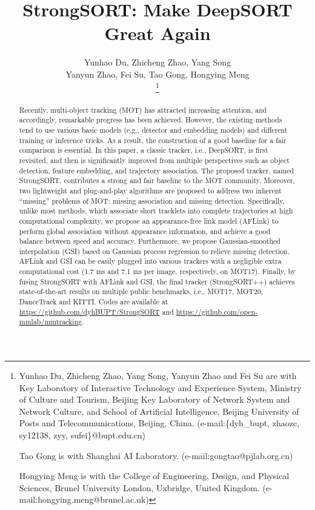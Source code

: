 \documentclass[lettersize,journal]{IEEEtran}
\begin{document}
\title{StrongSORT: Make DeepSORT Great Again}

\author{Yunhao Du, Zhicheng Zhao, Yang Song \\ Yanyun Zhao, Fei Su, Tao Gong, Hongying Meng \\
\thanks{
  Yunhao Du, Zhicheng Zhao, Yang Song, Yanyun Zhao and Fei Su 
  are with Key Laboratory of Interactive Technology and Experience System, Ministry of Culture and Tourism,
  Beijing Key Laboratory of Network System and Network Culture, 
  and School of Artificial Intelligence, Beijing University of Posts and Telecommunications, Beijing, China. 
  (e-mail:\{dyh\_bupt, zhaozc, sy12138, zyy, sufei\}@bupt.edu.cn)

  Tao Gong is with Shanghai AI Laboratory.
  (e-mail:gongtao@pjlab.org.cn)

  Hongying Meng is with the College of Engineering, Design, and Physical Sciences,
  Brunel University London, Uxbridge, United Kingdom.
  (e-mail:hongying.meng@brunel.ac.uk)
}
}






\maketitle

\begin{abstract}
  Recently, multi-object tracking (MOT) has attracted increasing attention, and accordingly, remarkable progress has been achieved.
  However, the existing methods tend to use various basic models (e.g., detector and embedding models) and different training or inference tricks.
  As a result, the construction of a good baseline for a fair comparison is essential.
  In this paper, a classic tracker, i.e., DeepSORT, is first revisited, 
  and then is significantly improved from multiple perspectives such as object detection, feature embedding, and trajectory association.
  The proposed tracker, named StrongSORT, contributes a strong and fair baseline to the MOT community.
  Moreover, two lightweight and plug-and-play algorithms are proposed to address two inherent ``missing'' problems of MOT: missing association and missing detection.
  Specifically, unlike most methods, which associate short tracklets into complete trajectories at high computational complexity, 
  we propose an appearance-free link model (AFLink) to perform global association without appearance information, and achieve a good balance between speed and accuracy.
  Furthermore, we propose Gaussian-smoothed interpolation (GSI) based on Gaussian process regression to relieve missing detection.
  AFLink and GSI can be easily plugged into various trackers with a negligible extra computational cost (1.7 ms and 7.1 ms per image, respectively, on MOT17).
  Finally, by fusing StrongSORT with AFLink and GSI, the final tracker (StrongSORT++) 
  achieves state-of-the-art results on multiple public benchmarks, i.e., MOT17, MOT20, DanceTrack and KITTI.
  Codes are available at \url{https://github.com/dyhBUPT/StrongSORT} and \url{https://github.com/open-mmlab/mmtracking}.
\end{abstract}
\end{document}
